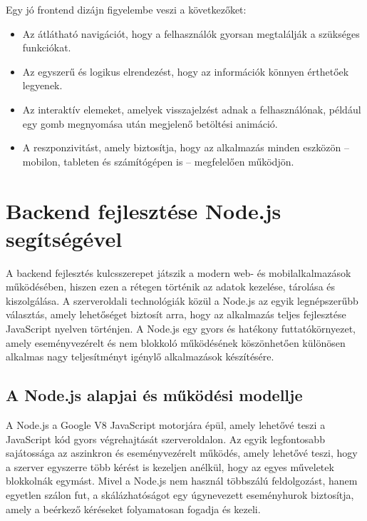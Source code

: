 \documentclass[
]{thesis-ekf}
\theoremstyle{definition}
\theoremstyle{remark}
\begin{document}
	Egy jó frontend dizájn figyelembe veszi a következőket:
	
	\begin{itemize}
		\item Az átlátható navigációt, hogy a felhasználók gyorsan megtalálják a szükséges funkciókat.
		
		\item Az egyszerű és logikus elrendezést, hogy az információk könnyen érthetőek legyenek.
		
		\item Az interaktív elemeket, amelyek visszajelzést adnak a felhasználónak, például egy gomb megnyomása után megjelenő betöltési animáció.
		
		\item A reszponzivitást, amely biztosítja, hogy az alkalmazás minden eszközön – mobilon, tableten és számítógépen is – megfelelően működjön.
	\end{itemize}
	
	\chapter{Backend fejlesztése Node.js segítségével}
	
A backend fejlesztés kulcsszerepet játszik a modern web- és mobilalkalmazások működésében, hiszen ezen a rétegen történik az adatok kezelése, tárolása és kiszolgálása. A szerveroldali technológiák közül a Node.js az egyik legnépszerűbb választás, amely lehetőséget biztosít arra, hogy az alkalmazás teljes fejlesztése JavaScript nyelven történjen. A Node.js egy gyors és hatékony futtatókörnyezet, amely eseményvezérelt és nem blokkoló működésének köszönhetően különösen alkalmas nagy teljesítményt igénylő alkalmazások készítésére.

\section{A Node.js alapjai és működési modellje}

A Node.js a Google V8 JavaScript motorjára épül, amely lehetővé teszi a JavaScript kód gyors végrehajtását szerveroldalon. Az egyik legfontosabb sajátossága az aszinkron és eseményvezérelt működés, amely lehetővé teszi, hogy a szerver egyszerre több kérést is kezeljen anélkül, hogy az egyes műveletek blokkolnák egymást. Mivel a Node.js nem használ többszálú feldolgozást, hanem egyetlen szálon fut, a skálázhatóságot egy úgynevezett eseményhurok biztosítja, amely a beérkező kéréseket folyamatosan fogadja és kezeli.
\end{document}
